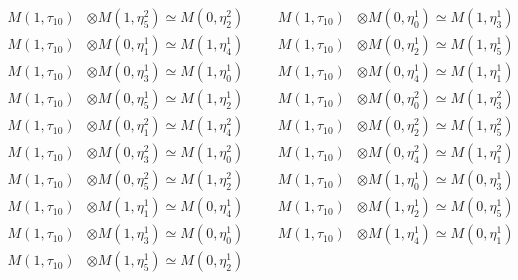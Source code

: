 \begin{align*}
M(1,\tau_{10}) &\otimes M(1,\eta^{2}_{5}) \simeq M(0,\eta^{2}_{2}) &&& M(1,\tau_{10}) &\otimes M(0,\eta^{1}_{0}) \simeq M(1,\eta^{1}_{3})\\
M(1,\tau_{10}) &\otimes M(0,\eta^{1}_{1}) \simeq M(1,\eta^{1}_{4}) &&& M(1,\tau_{10}) &\otimes M(0,\eta^{1}_{2}) \simeq M(1,\eta^{1}_{5})\\
M(1,\tau_{10}) &\otimes M(0,\eta^{1}_{3}) \simeq M(1,\eta^{1}_{0}) &&& M(1,\tau_{10}) &\otimes M(0,\eta^{1}_{4}) \simeq M(1,\eta^{1}_{1})\\
M(1,\tau_{10}) &\otimes M(0,\eta^{1}_{5}) \simeq M(1,\eta^{1}_{2}) &&& M(1,\tau_{10}) &\otimes M(0,\eta^{2}_{0}) \simeq M(1,\eta^{2}_{3})\\
M(1,\tau_{10}) &\otimes M(0,\eta^{2}_{1}) \simeq M(1,\eta^{2}_{4}) &&& M(1,\tau_{10}) &\otimes M(0,\eta^{2}_{2}) \simeq M(1,\eta^{2}_{5})\\
M(1,\tau_{10}) &\otimes M(0,\eta^{2}_{3}) \simeq M(1,\eta^{2}_{0}) &&& M(1,\tau_{10}) &\otimes M(0,\eta^{2}_{4}) \simeq M(1,\eta^{2}_{1})\\
M(1,\tau_{10}) &\otimes M(0,\eta^{2}_{5}) \simeq M(1,\eta^{2}_{2}) &&& M(1,\tau_{10}) &\otimes M(1,\eta^{1}_{0}) \simeq M(0,\eta^{1}_{3})\\
M(1,\tau_{10}) &\otimes M(1,\eta^{1}_{1}) \simeq M(0,\eta^{1}_{4}) &&& M(1,\tau_{10}) &\otimes M(1,\eta^{1}_{2}) \simeq M(0,\eta^{1}_{5})\\
M(1,\tau_{10}) &\otimes M(1,\eta^{1}_{3}) \simeq M(0,\eta^{1}_{0}) &&& M(1,\tau_{10}) &\otimes M(1,\eta^{1}_{4}) \simeq M(0,\eta^{1}_{1})\\
M(1,\tau_{10}) &\otimes M(1,\eta^{1}_{5}) \simeq M(0,\eta^{1}_{2})
\end{align*}

